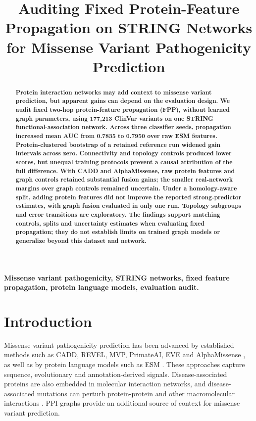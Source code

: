 \documentclass[conference]{IEEEtran}
\title{Auditing Fixed Protein-Feature Propagation on STRING Networks for Missense Variant Pathogenicity Prediction}
\author{}
\begin{document}
\maketitle


\begin{abstract}
\bfseries\boldmath
Protein interaction networks may add context to missense variant prediction, but apparent gains can depend on the evaluation design. We audit fixed two-hop protein-feature propagation (FPP), without learned graph parameters, using 177,213 ClinVar variants on one STRING functional-association network. Across three classifier seeds, propagation increased mean AUC from 0.7835 to 0.7950 over raw ESM features. Protein-clustered bootstrap of a retained reference run widened gain intervals across zero. Connectivity and topology controls produced lower scores, but unequal training protocols prevent a causal attribution of the full difference. With CADD and AlphaMissense, raw protein features and graph controls retained substantial fusion gains; the smaller real-network margins over graph controls remained uncertain. Under a homology-aware split, adding protein features did not improve the reported strong-predictor estimates, with graph fusion evaluated in only one run. Topology subgroups and error transitions are exploratory. The findings support matching controls, splits and uncertainty estimates when evaluating fixed propagation; they do not establish limits on trained graph models or generalize beyond this dataset and network.

\end{abstract}

\begin{IEEEkeywords}
\bfseries\boldmath
Missense variant pathogenicity, STRING networks, fixed feature propagation, protein language models, evaluation audit.
\end{IEEEkeywords}

\section{Introduction}

Missense variant pathogenicity prediction has been advanced by established methods such as CADD, REVEL, MVP, PrimateAI, EVE and AlphaMissense \cite{Kircher2014CADD,Ioannidis2016REVEL,Qi2021MVP,Sundaram2018PrimateAI,Frazer2021EVE,Cheng2023AlphaMissense}, as well as by protein language models such as ESM \cite{Lin2023ESM}. These approaches capture sequence, evolutionary and annotation-derived signals. Disease-associated proteins are also embedded in molecular interaction networks, and disease-associated mutations can perturb protein-protein and other macromolecular interactions \cite{Barabasi2011NetworkMedicine,Menche2015DiseaseModules,Sahni2015InteractionPerturbation,Chen2018InteractomePerturbation}. PPI graphs provide an additional source of context for missense variant prediction.
\end{document}
